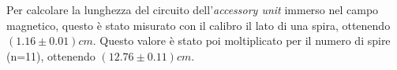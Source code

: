 {\fontsize{12}{14}\selectfont 

Per calcolare la lunghezza del circuito dell'\emph{accessory unit} immerso nel campo magnetico, questo è stato misurato con il calibro il lato di una spira, ottenendo $(1.16 \pm 0.01) cm$. Questo valore è stato poi moltiplicato per il numero di spire (n=11), ottenendo $(12.76 \pm 0.11) cm$. %








\par}